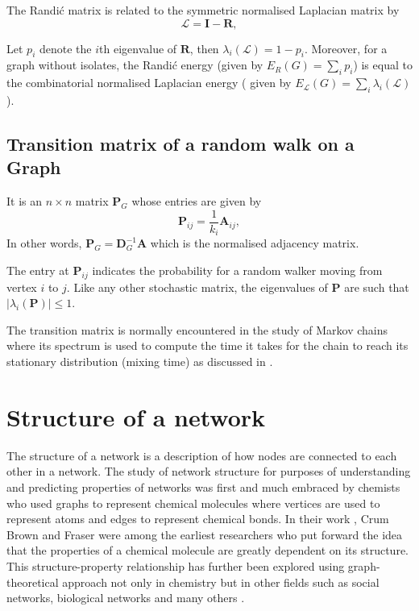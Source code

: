 \documentclass[10pt,a4paper]{article}
\theoremstyle{plain}
\theoremstyle{definition}
\begin{document}
The Randi\'{c} matrix is related to the symmetric normalised Laplacian matrix by
\begin{equation}
\mathcal{L} = \mathbf{I} -\mathbf{R},
\end{equation}

Let $p_i$ denote the $i$th eigenvalue of $\mathbf{R}$, then 
$\lambda_i (\mathcal{L}) = 1- p_i$. Moreover, for a graph without isolates, the Randi\'{c} energy (given by $E_{R}(G) = \sum_{i} p_i$) is equal to the combinatorial normalised Laplacian energy ( given by $ E_{\mathcal{L}} (G) = \sum_{i} \lambda_i (\mathcal{L})$).

\subsection{Transition matrix of a random walk on a Graph}
It is an $n \times n$ matrix $\mathbf{P}_G$ whose entries are given by
\begin{equation}
\mathbf{P}_{ij} = \frac{1}{k_i} \mathbf{A}_{ij},
\end{equation}
In other words, $\mathbf{P}_G = \mathbf{D}_{G} ^ {-1} \mathbf{A}$ which is the normalised adjacency matrix.

The entry at $\mathbf{P}_{ij}$ indicates the probability for a random walker moving from vertex $i$ to $j$. Like any other stochastic matrix, the eigenvalues of $\mathbf{P}$ are such that $|\lambda_i(\mathbf{P})| \leq 1$.

The transition matrix is normally encountered in the study of Markov chains where its spectrum is used to compute the time it takes for the chain to reach its stationary distribution (mixing time) as discussed in \citep{behrends2000introduction}.



\section{Structure of a network}

The structure of a network is a description of how nodes are connected to each other in a network. 
The study of network structure for purposes of understanding and predicting properties of networks was first and much embraced by chemists who used graphs to represent chemical molecules where vertices are used to represent atoms and edges to represent chemical
bonds.  In their work \citep{brown1868connection}, Crum Brown and Fraser were among the earliest researchers who put forward the idea that the properties of a chemical molecule are greatly dependent on its structure.  This structure-property relationship has further been explored using graph-theoretical approach not only in chemistry but in other fields such as social networks, biological networks and many others \citep{mihalic1992graph,smith2004associations,wellman1988social,wey2008social}.  
\end{document}

